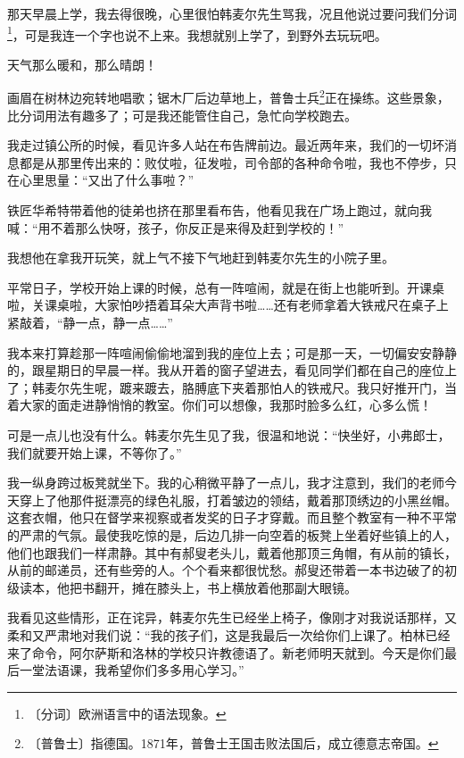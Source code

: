 \documentclass[12pt,UTF-8,openany]{ctexbook}
\begin{document}
\begin{normalsize}
    
    那天早晨上学，我去得很晚，心里很怕韩麦尔先生骂我，况且他说过要问我们分词\footnote{〔分词〕欧洲语言中的语法现象。}，可是我连一个字也说不上来。我想就别上学了，到野外去玩玩吧。
    
    天气那么暖和，那么晴朗！
    
    画眉在树林边宛转地唱歌；锯木厂后边草地上，普鲁士兵\footnote{〔普鲁士〕指德国。1871年，普鲁士王国击败法国后，成立德意志帝国。}正在操练。这些景象，比分词用法有趣多了；可是我还能管住自己，急忙向学校跑去。
    
    我走过镇公所的时候，看见许多人站在布告牌前边。最近两年来，我们的一切坏消息都是从那里传出来的：败仗啦，征发啦，司令部的各种命令啦，我也不停步，只在心里思量：“又出了什么事啦？”
    
    铁匠华希特带着他的徒弟也挤在那里看布告，他看见我在广场上跑过，就向我喊：“用不着那么快呀，孩子，你反正是来得及赶到学校的！”
    
    我想他在拿我开玩笑，就上气不接下气地赶到韩麦尔先生的小院子里。
    
    平常日子，学校开始上课的时候，总有一阵喧闹，就是在街上也能听到。开课桌啦，关课桌啦，大家怕吵捂着耳朵大声背书啦……还有老师拿着大铁戒尺在桌子上紧敲着，“静一点，静一点……”
    
    我本来打算趁那一阵喧闹偷偷地溜到我的座位上去；可是那一天，一切偏安安静静的，跟星期日的早晨一样。我从开着的窗子望进去，看见同学们都在自己的座位上了；韩麦尔先生呢，踱来踱去，胳膊底下夹着那怕人的铁戒尺。我只好推开门，当着大家的面走进静悄悄的教室。你们可以想像，我那时脸多么红，心多么慌！
    
    可是一点儿也没有什么。韩麦尔先生见了我，很温和地说：“快坐好，小弗郎士，我们就要开始上课，不等你了。”
    
    我一纵身跨过板凳就坐下。我的心稍微平静了一点儿，我才注意到，我们的老师今天穿上了他那件挺漂亮的绿色礼服，打着皱边的领结，戴着那顶绣边的小黑丝帽。这套衣帽，他只在督学来视察或者发奖的日子才穿戴。而且整个教室有一种不平常的严肃的气氛。最使我吃惊的是，后边几排一向空着的板凳上坐着好些镇上的人，他们也跟我们一样肃静。其中有郝叟老头儿，戴着他那顶三角帽，有从前的镇长，从前的邮递员，还有些旁的人。个个看来都很忧愁。郝叟还带着一本书边破了的初级读本，他把书翻开，摊在膝头上，书上横放着他那副大眼镜。
    
    我看见这些情形，正在诧异，韩麦尔先生已经坐上椅子，像刚才对我说话那样，又柔和又严肃地对我们说：“我的孩子们，这是我最后一次给你们上课了。柏林已经来了命令，阿尔萨斯和洛林的学校只许教德语了。新老师明天就到。今天是你们最后一堂法语课，我希望你们多多用心学习。”
    

\end{normalsize}
\end{document}
